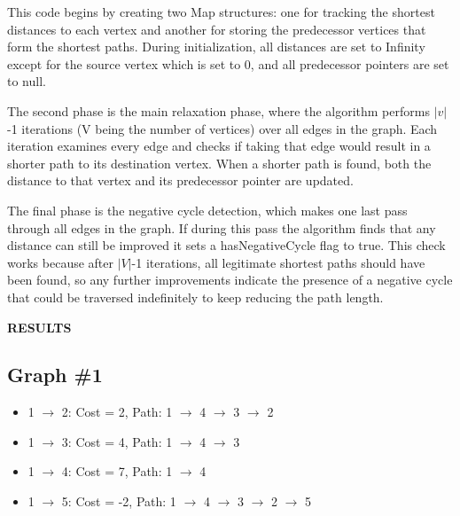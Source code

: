 \documentclass[12pt,letterpaper, onecolumn]{exam}
\begin{document}
\vspace{.4cm}

\centering This code begins by creating two Map structures: one for tracking the shortest distances to each vertex and another for storing the predecessor vertices that form the shortest paths. During initialization, all distances are set to Infinity except for the source vertex which is set to 0, and all predecessor pointers are set to null.

\vspace{.2cm}

The second phase is the main relaxation phase, where the algorithm performs \(|v|\) -1 iterations (V being the number of vertices) over all edges in the graph. Each iteration examines every edge and checks if taking that edge would result in a shorter path to its destination vertex. When a shorter path is found, both the distance to that vertex and its predecessor pointer are updated. 

\vspace{.2cm}

The final phase is the negative cycle detection, which makes one last pass through all edges in the graph. If during this pass the algorithm finds that any distance can still be improved it sets a hasNegativeCycle flag to true. This check works because after \(|V|\)-1 iterations, all legitimate shortest paths should have been found, so any further improvements indicate the presence of a negative cycle that could be traversed indefinitely to keep reducing the path length.

\vspace{.3cm}

\newpage

\textbf{RESULTS}
\subsection*{Graph \#1}
\begin{itemize}[noitemsep, topsep=0pt]
    \item 1 $\rightarrow$ 2: Cost = 2, Path: 1 $\rightarrow$ 4 $\rightarrow$ 3 $\rightarrow$ 2
    \item 1 $\rightarrow$ 3: Cost = 4, Path: 1 $\rightarrow$ 4 $\rightarrow$ 3
    \item 1 $\rightarrow$ 4: Cost = 7, Path: 1 $\rightarrow$ 4
    \item 1 $\rightarrow$ 5: Cost = -2, Path: 1 $\rightarrow$ 4 $\rightarrow$ 3 $\rightarrow$ 2 $\rightarrow$ 5
\end{itemize}
\end{document}
